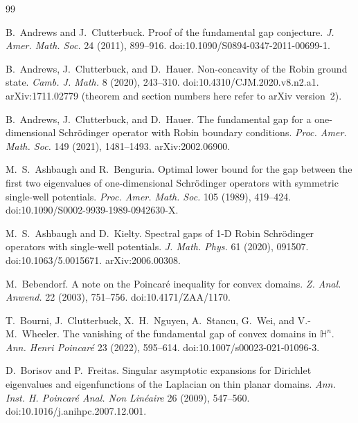 \documentclass[11pt,a4paper]{article}
\numberwithin{equation}{section}
\theoremstyle{paperplain}
\theoremstyle{remark}
\begin{document}
\begin{thebibliography}{99}
\small\setlength{\itemsep}{0.25em}

B.~Andrews and J.~Clutterbuck.
\newblock Proof of the fundamental gap conjecture.
\newblock \emph{J. Amer. Math. Soc.} 24 (2011), 899--916.
\newblock doi:10.1090/S0894-0347-2011-00699-1.

B.~Andrews, J.~Clutterbuck, and D.~Hauer.
\newblock Non-concavity of the {R}obin ground state.
\newblock \emph{Camb. J. Math.} 8 (2020), 243--310.
\newblock doi:10.4310/CJM.2020.v8.n2.a1. arXiv:1711.02779 (theorem and
  section numbers here refer to arXiv version~2).

B.~Andrews, J.~Clutterbuck, and D.~Hauer.
\newblock The fundamental gap for a one-dimensional {S}chr\"odinger operator
  with {R}obin boundary conditions.
\newblock \emph{Proc. Amer. Math. Soc.} 149 (2021), 1481--1493.
\newblock arXiv:2002.06900.

M.~S.~Ashbaugh and R.~Benguria.
\newblock Optimal lower bound for the gap between the first two eigenvalues
  of one-dimensional {S}chr\"odinger operators with symmetric single-well
  potentials.
\newblock \emph{Proc. Amer. Math. Soc.} 105 (1989), 419--424.
\newblock doi:10.1090/S0002-9939-1989-0942630-X.

M.~S.~Ashbaugh and D.~Kielty.
\newblock Spectral gaps of 1-{D} {R}obin {S}chr\"odinger operators with
  single-well potentials.
\newblock \emph{J. Math. Phys.} 61 (2020), 091507.
\newblock doi:10.1063/5.0015671. arXiv:2006.00308.

M.~Bebendorf.
\newblock A note on the {P}oincar\'e inequality for convex domains.
\newblock \emph{Z. Anal. Anwend.} 22 (2003), 751--756.
\newblock doi:10.4171/ZAA/1170.

T.~Bourni, J.~Clutterbuck, X.~H.~Nguyen, A.~Stancu, G.~Wei, and
  V.-M.~Wheeler.
\newblock The vanishing of the fundamental gap of convex domains in
  $\mathbb H^n$.
\newblock \emph{Ann. Henri Poincar\'e} 23 (2022), 595--614.
\newblock doi:10.1007/s00023-021-01096-3.

D.~Borisov and P.~Freitas.
\newblock Singular asymptotic expansions for {D}irichlet eigenvalues and
  eigenfunctions of the {L}aplacian on thin planar domains.
\newblock \emph{Ann. Inst. H. Poincar\'e Anal. Non Lin\'eaire} 26 (2009),
  547--560.
\newblock doi:10.1016/j.anihpc.2007.12.001.


\end{thebibliography}
\end{document}
